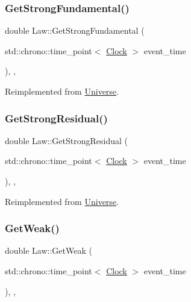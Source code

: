 \subsubsection{\texorpdfstring{Get\+Strong\+Fundamental()}{GetStrongFundamental()}}
{\footnotesize\ttfamily double Law\+::\+Get\+Strong\+Fundamental (\begin{DoxyParamCaption}\item[{std\+::chrono\+::time\+\_\+point$<$ \mbox{\hyperlink{universe_8h_a0ef8d951d1ca5ab3cfaf7ab4c7a6fd80}{Clock}} $>$}]{event\+\_\+time }\end{DoxyParamCaption})\hspace{0.3cm}{\ttfamily [inline]}, {\ttfamily [final]}, {\ttfamily [virtual]}}



Reimplemented from \mbox{\hyperlink{classUniverse_ab44daccba01ee7e3cf9b50bba83dd19e}{Universe}}.

\mbox{\label{classLaw_a70fb2a7710776c4e2315a1e29fe35eb6}} 
\subsubsection{\texorpdfstring{Get\+Strong\+Residual()}{GetStrongResidual()}}
{\footnotesize\ttfamily double Law\+::\+Get\+Strong\+Residual (\begin{DoxyParamCaption}\item[{std\+::chrono\+::time\+\_\+point$<$ \mbox{\hyperlink{universe_8h_a0ef8d951d1ca5ab3cfaf7ab4c7a6fd80}{Clock}} $>$}]{event\+\_\+time }\end{DoxyParamCaption})\hspace{0.3cm}{\ttfamily [inline]}, {\ttfamily [final]}, {\ttfamily [virtual]}}



Reimplemented from \mbox{\hyperlink{classUniverse_af0f4b81950061e63c2855eb40957a5b1}{Universe}}.

\mbox{\label{classLaw_a303c365b7a17997a63a74756fc72fba3}} 
\subsubsection{\texorpdfstring{Get\+Weak()}{GetWeak()}}
{\footnotesize\ttfamily double Law\+::\+Get\+Weak (\begin{DoxyParamCaption}\item[{std\+::chrono\+::time\+\_\+point$<$ \mbox{\hyperlink{universe_8h_a0ef8d951d1ca5ab3cfaf7ab4c7a6fd80}{Clock}} $>$}]{event\+\_\+time }\end{DoxyParamCaption})\hspace{0.3cm}{\ttfamily [inline]}, {\ttfamily [final]}, {\ttfamily [virtual]}}



